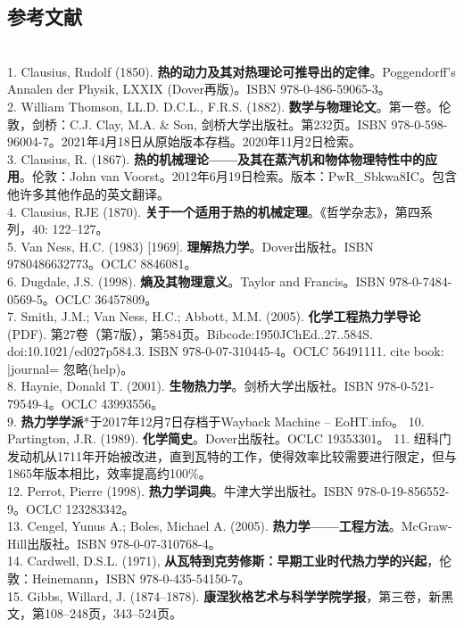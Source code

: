 \subsection{参考文献}\\
1. Clausius, Rudolf (1850). \textbf{热的动力及其对热理论可推导出的定律}。Poggendorff's Annalen der Physik, LXXIX (Dover再版)。ISBN 978-0-486-59065-3。\\
2. William Thomson, LL.D. D.C.L., F.R.S. (1882). \textbf{数学与物理论文}。第一卷。伦敦，剑桥：C.J. Clay, M.A. & Son, 剑桥大学出版社。第232页。ISBN 978-0-598-96004-7。2021年4月18日从原始版本存档。2020年11月2日检索。\\
3. Clausius, R. (1867). \textbf{热的机械理论——及其在蒸汽机和物体物理特性中的应用}。伦敦：John van Voorst。2012年6月19日检索。版本：PwR_Sbkwa8IC。包含他许多其他作品的英文翻译。\\
4. Clausius, RJE (1870). \textbf{关于一个适用于热的机械定理}。《哲学杂志》，第四系列，40: 122–127。\\
5. Van Ness, H.C. (1983) [1969]. \textbf{理解热力学}。Dover出版社。ISBN 9780486632773。OCLC 8846081。\\
6. Dugdale, J.S. (1998). \textbf{熵及其物理意义}。Taylor and Francis。ISBN 978-0-7484-0569-5。OCLC 36457809。\\
7. Smith, J.M.; Van Ness, H.C.; Abbott, M.M. (2005). \textbf{化学工程热力学导论}(PDF). 第27卷（第7版），第584页。Bibcode:1950JChEd..27..584S. doi:10.1021/ed027p584.3. ISBN 978-0-07-310445-4。OCLC 56491111. {{cite book}}: |journal= 忽略(help)。\\
8. Haynie, Donald T. (2001). \textbf{生物热力学}。剑桥大学出版社。ISBN 978-0-521-79549-4。OCLC 43993556。\\
9. \textbf{热力学学派}*于2017年12月7日存档于Wayback Machine – EoHT.info。
10. Partington, J.R. (1989). \textbf{化学简史}。Dover出版社。OCLC 19353301。
11. 纽科门发动机从1711年开始被改进，直到瓦特的工作，使得效率比较需要进行限定，但与1865年版本相比，效率提高约100\%。\\
12. Perrot, Pierre (1998). \textbf{热力学词典}。牛津大学出版社。ISBN 978-0-19-856552-9。OCLC 123283342。\\
13. Cengel, Yunus A.; Boles, Michael A. (2005). \textbf{热力学——工程方法}。McGraw-Hill出版社。ISBN 978-0-07-310768-4。\\
14. Cardwell, D.S.L. (1971), \textbf{从瓦特到克劳修斯：早期工业时代热力学的兴起}，伦敦：Heinemann，ISBN 978-0-435-54150-7。\\
15. Gibbs, Willard, J. (1874–1878). \textbf{康涅狄格艺术与科学学院学报}，第三卷，新黑文，第108–248页，343–524页。\\
